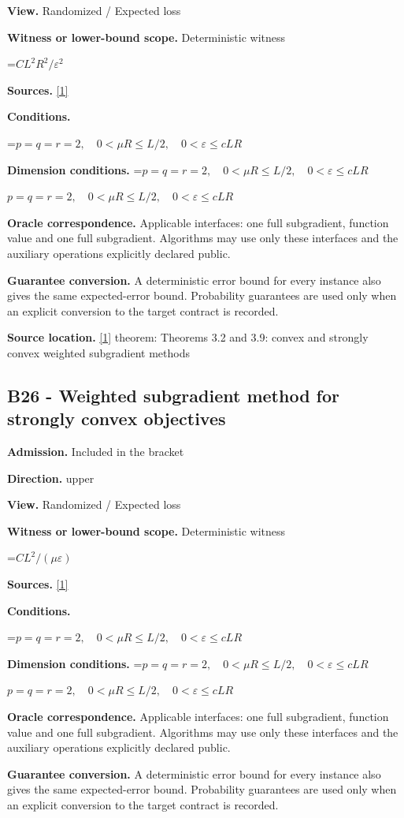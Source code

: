 \documentclass[10pt,a4paper]{article}
\newcommand{\AtlasMath}[1]{\par\begingroup\centering\setbox0=\hbox{$\displaystyle #1$}\ifdim\wd0>1.4\linewidth\typeout{ATLAS WIDE FORMULA: \the\wd0}\fi\ifdim\wd0>\linewidth\resizebox{\linewidth}{!}{\box0}\else\box0\fi\par\endgroup}
\newcommand{\AtlasInlineMath}[1]{\begingroup\setbox0=\hbox{$#1$}\ifdim\wd0>.4\linewidth\endgroup\AtlasMath{#1}\else\endgroup$#1$\fi}
\begin{document}
\textbf{View.} Randomized / Expected loss

\textbf{Witness or lower-bound scope.} Deterministic witness

\AtlasMath{C L^2R^2/\varepsilon^2}
\textbf{Sources.} \href{https://arxiv.org/pdf/1405.4980}{[1]}

\textbf{Conditions.} 
\AtlasMath{p=q=r=2,\quad0<\mu R\le L/2,\quad0<\varepsilon\le cLR}


\textbf{Dimension conditions.} \AtlasInlineMath{p=q=r=2,\quad0<\mu R\le L/2,\quad0<\varepsilon\le cLR}

\textbf{Oracle correspondence.} Applicable interfaces: one full subgradient, function value and one full subgradient. Algorithms may use only these interfaces and the auxiliary operations explicitly declared public.

\textbf{Guarantee conversion.} A deterministic error bound for every instance also gives the same expected-error bound. Probability guarantees are used only when an explicit conversion to the target contract is recorded.

\textbf{Source location.} \href{https://arxiv.org/pdf/1405.4980}{[1]} theorem: Theorems 3.2 and 3.9: convex and strongly convex weighted subgradient methods

\subsection{B26 - Weighted subgradient method for strongly convex objectives}
\textbf{Admission.} Included in the bracket

\textbf{Direction.} upper

\textbf{View.} Randomized / Expected loss

\textbf{Witness or lower-bound scope.} Deterministic witness

\AtlasMath{C L^2/(\mu\varepsilon)}
\textbf{Sources.} \href{https://arxiv.org/pdf/1405.4980}{[1]}

\textbf{Conditions.} 
\AtlasMath{p=q=r=2,\quad0<\mu R\le L/2,\quad0<\varepsilon\le cLR}


\textbf{Dimension conditions.} \AtlasInlineMath{p=q=r=2,\quad0<\mu R\le L/2,\quad0<\varepsilon\le cLR}

\textbf{Oracle correspondence.} Applicable interfaces: one full subgradient, function value and one full subgradient. Algorithms may use only these interfaces and the auxiliary operations explicitly declared public.

\textbf{Guarantee conversion.} A deterministic error bound for every instance also gives the same expected-error bound. Probability guarantees are used only when an explicit conversion to the target contract is recorded.
\end{document}
